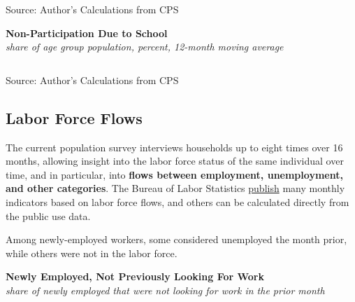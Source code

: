 \documentclass{report}
\makeatletter
\newcommand{\tbllink}[1]{\href{https://raw.githubusercontent.com/bdecon/US-chartbook/master/chartbook/data/#1}{\faTable}}
\newcommand*\short[1]{\expandafter\@gobbletwo\number\numexpr#1\relax}
\newcommand{\dateaxisticks}{
		date coordinates in=x, axis line style={draw=none},
		xmax={2024-01-31},
		max space between ticks=40,	    
		xtick={{1990-01-01}, {1992-01-01}, {1994-01-01}, 
			{1996-01-01}, {1998-01-01}, {2000-01-01}, 
			{2002-01-01}, {2004-01-01}, {2006-01-01},
			{2008-01-01}, {2010-01-01}, {2012-01-01}, {2014-01-01},
		    {2016-01-01}, {2018-01-01}, {2020-01-01}, {2022-01-01}, 
		    {2024-01-01}, {2026-01-01}},
		minor xtick={{1989-01-01}, {1991-01-01}, {1993-01-01},
			{1995-01-01}, {1997-01-01}, {1999-01-01}, 
			{2001-01-01}, {2003-01-01}, {2005-01-01}, {2007-01-01},
		    {2009-01-01}, {2011-01-01}, {2013-01-01}, {2015-01-01},
		    {2017-01-01}, {2019-01-01}, {2021-01-01}, {2023-01-01}, 
		    {2025-01-01}, {2027-01-01}},
		enlarge y limits={0.06}, enlarge x limits={0.01},
		xticklabel style={align=center, yshift=-2pt}, tick label style={inner sep=0pt},
		}
\newcommand{\bbar}[2]{extra #1 ticks = {{#2}}, extra #1 tick labels = ,
		extra #1 tick style = {grid=major, grid style={thick, black!25}},}
\newcommand{\stdline}[4]{\addplot[very thick, no markers, color=#1] 
		table [x=#2, y=#3, col sep=comma] {#4};	}
\newcommand{\thickline}[4]{\addplot[ultra thick, no markers, color=#1] 
		table [x=#2, y=#3, col sep=comma] {#4};	}
\newcommand{\rbars}{
		\fill[color=black!10] (axis cs:{1990-07-01},\pgfkeysvalueof{/pgfplots/ymin})
			rectangle (axis cs:{1991-03-01}, \pgfkeysvalueof{/pgfplots/ymax});
		\fill[color=black!10] (axis cs:{2007-12-01},\pgfkeysvalueof{/pgfplots/ymin})
			rectangle (axis cs:{2009-07-01}, \pgfkeysvalueof{/pgfplots/ymax});
		\fill[color=black!10] (axis cs:{2001-03-01},\pgfkeysvalueof{/pgfplots/ymin})
			rectangle (axis cs:{2001-11-01}, \pgfkeysvalueof{/pgfplots/ymax});
		\fill[color=black!10] (axis cs:{2020-02-01},\pgfkeysvalueof{/pgfplots/ymin})
			rectangle (axis cs:{2020-05-01}, \pgfkeysvalueof{/pgfplots/ymax});}
\makeatother
\begin{document}
{\begin{minipage}{1.0\textwidth}
\footnotesize{Source: Author's Calculations from CPS} \hfill \tbllink{young_school.csv}
\vspace{5mm}

\normalsize{\textbf{Non-Participation Due to School}}\\
\footnotesize{\textit{share of age group population, percent, 12-month moving average}}\\
\hspace*{-2mm} \noindent {} \setlength{\tabcolsep}{2.5pt} \color{black!90}
		{\renewcommand{\arraystretch}{1.58}
		 \begin{tabular}{p{22mm} R{10mm} R{10mm} R{10mm} R{10mm} R{10mm} 
		 	R{10mm} R{10mm} R{10mm}}
			  \hline
		\end{tabular}}
		
	\vspace{-1mm}
\footnotesize{Source: Author's Calculations from CPS} 
\end{minipage}
\newpage
\hypertarget{labf}{\label{labf}}
\begin{minipage}{1.0\textwidth}  
\subsection*{Labor Force Flows}
\small The current population survey interviews households up to eight times over 16 months, allowing insight into the labor force status of the same individual over time, and in particular, into \textbf{flows between employment, unemployment, and other categories}. The Bureau of Labor Statistics \href{https://www.bls.gov/cps/cps_flows.htm}{publish} many monthly indicators based on labor force flows, and others can be calculated directly from the public use data.

Among newly-employed workers, some considered unemployed the month prior, while others were not in the labor force.  
\vspace{2mm}

\normalsize \textbf{Newly Employed, Not Previously Looking For Work}\\
\footnotesize{\textit{share of newly employed that were not looking for work in the prior month}}
\vspace{3.8cm}

\hspace{3mm} 


\end{minipage}}
\end{document}
